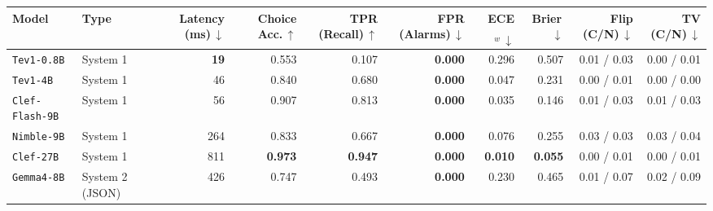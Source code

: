 \begin{tabular}{llrrrrrrrr}
\toprule
Model & Type & Latency (ms)\,$\downarrow$ & Choice Acc.\,$\uparrow$ & TPR (Recall)\,$\uparrow$ & FPR (Alarms)\,$\downarrow$ & ECE$_{w}\,\downarrow$ & Brier\,$\downarrow$ & Flip (C/N)\,$\downarrow$ & TV (C/N)\,$\downarrow$ \\
\midrule
\texttt{Tev1-0.8B} & System 1 & \textbf{19} & 0.553 & 0.107 & \textbf{0.000} & 0.296 & 0.507 & 0.01 / 0.03 & 0.00 / 0.01 \\
\texttt{Tev1-4B} & System 1 & 46 & 0.840 & 0.680 & \textbf{0.000} & 0.047 & 0.231 & 0.00 / 0.01 & 0.00 / 0.00 \\
\texttt{Clef-Flash-9B} & System 1 & 56 & 0.907 & 0.813 & \textbf{0.000} & 0.035 & 0.146 & 0.01 / 0.03 & 0.01 / 0.03 \\
\texttt{Nimble-9B} & System 1 & 264 & 0.833 & 0.667 & \textbf{0.000} & 0.076 & 0.255 & 0.03 / 0.03 & 0.03 / 0.04 \\
\texttt{Clef-27B} & System 1 & 811 & \textbf{0.973} & \textbf{0.947} & \textbf{0.000} & \textbf{0.010} & \textbf{0.055} & 0.00 / 0.01 & 0.00 / 0.01 \\
\texttt{Gemma4-8B} & System 2 (JSON) & 426 & 0.747 & 0.493 & \textbf{0.000} & 0.230 & 0.465 & 0.01 / 0.07 & 0.02 / 0.09 \\
\bottomrule
\end{tabular}
